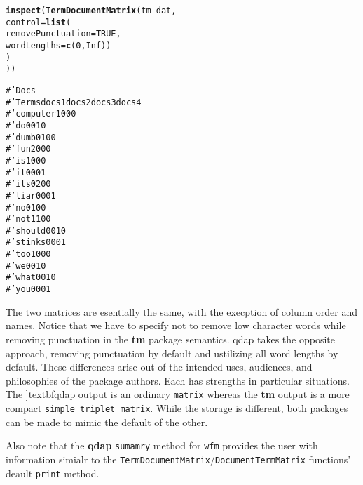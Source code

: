 \documentclass{article}\usepackage[]{graphicx}\usepackage[]{color}
\makeatletter
\newcommand{\hlkwd}[1]{\textcolor[rgb]{0.737,0.353,0.396}{\textbf{#1}}}%
\newenvironment{kframe}{%
 \def\at@end@of@kframe{}%
 \ifinner\ifhmode%
  \def\at@end@of@kframe{\end{minipage}}%
  \begin{minipage}{\columnwidth}%
 \fi\fi%
 \def\FrameCommand##1{\hskip\@totalleftmargin \hskip-\fboxsep
 \colorbox{shadecolor}{##1}\hskip-\fboxsep
     \hskip-\linewidth \hskip-\@totalleftmargin \hskip\columnwidth}%
 \MakeFramed {\advance\hsize-\width
   \@totalleftmargin\z@ \linewidth\hsize
   \@setminipage}}%
 {\par\unskip\endMakeFramed%
 \at@end@of@kframe}
\newenvironment{knitrout}{}{} %
\makeatother
\begin{document}
\begin{knitrout}
\color{fgcolor}\begin{kframe}
\begin{alltt}
\hlkwd{inspect}(\hlkwd{TermDocumentMatrix}(tm_dat, 
    control = \hlkwd{list}(
        removePunctuation = TRUE, 
        wordLengths=\hlkwd{c}(0, Inf))
    )
))
\end{alltt}
\end{kframe}
\end{knitrout}


\begin{knitrout}
\color{fgcolor}\begin{kframe}
\begin{alltt}
#'           Docs
#' Terms      docs 1 docs 2 docs 3 docs 4
#'   computer      1      0      0      0
#'   do            0      0      1      0
#'   dumb          0      1      0      0
#'   fun           2      0      0      0
#'   is            1      0      0      0
#'   it            0      0      0      1
#'   its           0      2      0      0
#'   liar          0      0      0      1
#'   no            0      1      0      0
#'   not           1      1      0      0
#'   should        0      0      1      0
#'   stinks        0      0      0      1
#'   too           1      0      0      0
#'   we            0      0      1      0
#'   what          0      0      1      0
#'   you           0      0      0      1
\end{alltt}
\end{kframe}
\end{knitrout}

The two matrices are esentially the same, with the execption of column order and names.  Notice that we have to specify not to remove low character words while removing punctuation in the \textbf{tm} package semantics.  qdap takes the opposite approach, removing punctuation by default and ustilizing all word lengths by default.  These differences arise out of the intended uses, audiences, and philosophies of the package authors.  Each has strengths in particular situations.  The ]textbf{qdap} output is an ordinary \texttt{matrix} whereas the \textbf{tm} output is a more compact \texttt{simple triplet matrix}.  While the storage is different, both packages can be made to mimic the default of the other.  

Also note that the \textbf{qdap} \texttt{sumamry} method for \texttt{wfm} provides the user with information simialr to the \texttt{TermDocumentMatrix}/\texttt{DocumentTermMatrix} functions' deault \texttt{print} method.
\end{document}

